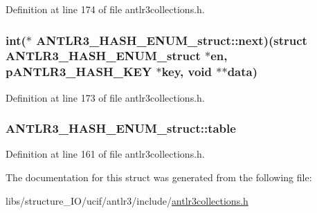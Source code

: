 Definition at line 174 of file antlr3collections.\-h.

\hypertarget{struct_a_n_t_l_r3___h_a_s_h___e_n_u_m__struct_a2d8768bcca37e77b64cc9ab2651ce134}{
\subsubsection[{next}]{\setlength{\rightskip}{0pt plus 5cm}int($\ast$ A\-N\-T\-L\-R3\-\_\-\-H\-A\-S\-H\-\_\-\-E\-N\-U\-M\-\_\-struct\-::next)(struct {\bf A\-N\-T\-L\-R3\-\_\-\-H\-A\-S\-H\-\_\-\-E\-N\-U\-M\-\_\-struct} $\ast$en, {\bf p\-A\-N\-T\-L\-R3\-\_\-\-H\-A\-S\-H\-\_\-\-K\-E\-Y} $\ast$key, void $\ast$$\ast$data)}}\label{struct_a_n_t_l_r3___h_a_s_h___e_n_u_m__struct_a2d8768bcca37e77b64cc9ab2651ce134}


Definition at line 173 of file antlr3collections.\-h.

\hypertarget{struct_a_n_t_l_r3___h_a_s_h___e_n_u_m__struct_ac6f3d9cc871f25ae1f009a3c816721a4}{
\subsubsection[{table}]{ A\-N\-T\-L\-R3\-\_\-\-H\-A\-S\-H\-\_\-\-E\-N\-U\-M\-\_\-struct\-::table}}\label{struct_a_n_t_l_r3___h_a_s_h___e_n_u_m__struct_ac6f3d9cc871f25ae1f009a3c816721a4}


Definition at line 161 of file antlr3collections.\-h.



The documentation for this struct was generated from the following file\-:\begin{DoxyCompactItemize}
\item 
libs/structure\-\_\-\-I\-O/ucif/antlr3/include/\hyperlink{antlr3collections_8h}{antlr3collections.\-h}\end{DoxyCompactItemize}
